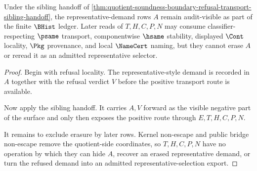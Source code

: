 \begin{theorem}
\label{thm:quotient-soundness-boundary-representative-demand-exposure}
Under the sibling handoff of
\autoref{thm:quotient-soundness-boundary-refusal-transport-sibling-handoff},
the representative-demand rows $A$ remain audit-visible as part of the finite
$\BHist$ ledger. Later reads of $T,H,C,P,N$ may consume classifier-respecting
$\psame$ transport, componentwise $\hsame$ stability, displayed $\Cont$
locality, $\Pkg$ provenance, and local $\NameCert$ naming, but they cannot
erase $A$ or reread it as an admitted representative selector.
\end{theorem}
\begin{proof}
Begin with refusal locality. The representative-style demand is recorded in
$A$ together with the refusal verdict $V$ before the positive transport route
is available.

Now apply the sibling handoff. It carries $A,V$ forward as the visible negative
part of the surface and only then exposes the positive route through
$E,T,H,C,P,N$.

It remains to exclude erasure by later rows. Kernel non-escape and public
bridge non-escape remove the quotient-side coordinates, so $T,H,C,P,N$ have no
operation by which they can hide $A$, recover an erased representative demand,
or turn the refused demand into an admitted representative-selection export.
\end{proof}

